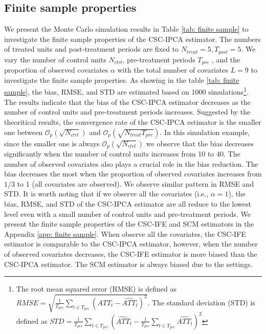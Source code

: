 \documentclass[12pt]{article}
\begin{document}
\subsection{Finite sample properties}
We present the Monte Carlo simulation results in Table \ref{tab: finite sample} to investigate the finite sample properties of the CSC-IPCA estimator. The numbers of treated units and post-treatment periods are fixed to $N_{treat} = 5, T_{post}=5$. We vary the number of control units $N_{ctrl}$, pre-treatment periods $T_{pre}$ , and the proportion of observed covariates $\alpha$ with the total number of covariates $L=9$ to investigate the finite sample properties. As showing in the table \ref{tab: finite sample}, the bias, RMSE, and STD are estimated based on 1000 simulations\footnote{The root mean squared error (RMSE) is defined as $RMSE = \sqrt{\frac{1}{T_{pre}}\sum_{t \in T_{pre}}\left(ATT_t - \widehat{ATT}_t\right)^2}$. The standard deviation (STD) is defined as $STD = \frac{1}{T_{pre}}\sum_{t \in T_{pre}}\left(\widehat{ATT}_t - \frac{1}{T_{pre}}\sum_{t \in T_{pre}}\widehat{ATT_t}\right)^2$}. The results indicate that the bias of the CSC-IPCA estimator decreases as the number of control units and pre-treatment periods increases. Suggested by the theoritical results, the convergence rate of the CSC-IPCA estimator is the smaller one between $\mathcal{O}_p\left(\sqrt{N_{ctrl}}\right)$ and $\mathcal{O}_p\left(\sqrt{N_{treat}T_{pre}}\right)$. In this simulation example, since the smaller one is always $\mathcal{O}_p\left(\sqrt{N_{ctrl}}\right)$ we observe that the bias decreases significantly when the number of control units increases from 10 to 40. The number of observed covariates also plays a crucial role in the bias reduction. The bias decreases the most when the proportion of observed covariates increases from $1/3$ to 1 (all covariates are observed). We observe similar pattern in RMSE and STD. It is worth noting that if we observe all the covariates (i.e., $\alpha = 1$), the bias, RMSE, and STD of the CSC-IPCA estimator are all reduce to the lowest level even with a small number of control units and pre-treatment periods. We present the finite sample properties of the CSC-IFE and SCM estimators in the Appendix \ref{app: finite sample}. When observe all the covariates, the CSC-IFE estimator is comparable to the CSC-IPCA estimator, however, when the number of observed covariates decreases, the CSC-IFE estimator is more biased than the CSC-IPCA estimator. The SCM estimator is always biased due to the settings.
\end{document}
